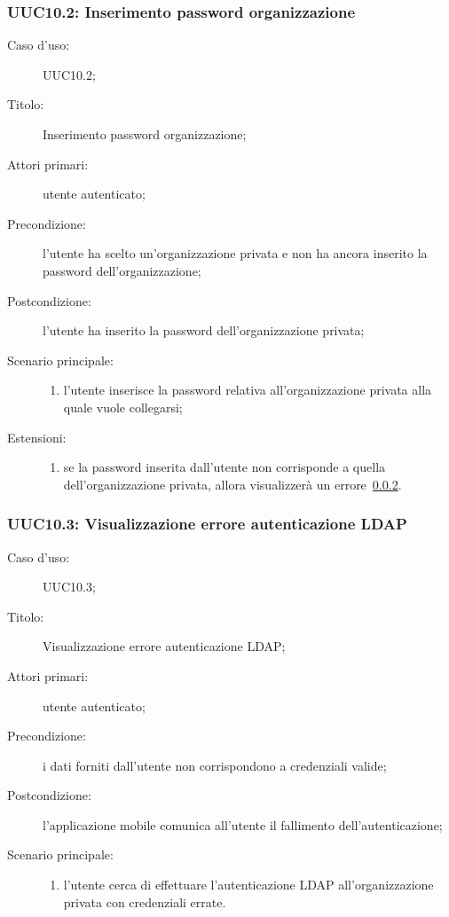 \documentclass[../../../analisi-dei-requisiti.tex]{subfiles}
\begin{document}
\subsubsection{UUC10.2: Inserimento password organizzazione}%
\label{subs:UUC10.2}
\begin{description}
  \item[Caso d’uso:] UUC10.2;
  \item[Titolo:] Inserimento password organizzazione;
  \item[Attori primari:] utente autenticato;
  \item[Precondizione:] l'utente ha scelto un'organizzazione privata e non ha ancora inserito la password dell'organizzazione;
  \item[Postcondizione:] l'utente ha inserito la password dell'organizzazione privata;
  \item[Scenario principale:]
        \begin{enumerate}
          \item l'utente inserisce la password relativa all'organizzazione privata alla quale vuole collegarsi;
        \end{enumerate}
  \item[Estensioni:]
        \begin{enumerate}
          \item se la password inserita dall'utente non corrisponde a quella dell'organizzazione privata, allora visualizzerà un errore~\ref{subs:UUC10.3}.
        \end{enumerate}
\end{description}

\subsubsection{UUC10.3: Visualizzazione errore autenticazione LDAP}%
\label{subs:UUC10.3}
\begin{description}
  \item[Caso d’uso:] UUC10.3;
  \item[Titolo:] Visualizzazione errore autenticazione LDAP\@;
  \item[Attori primari:] utente autenticato;
  \item[Precondizione:] i dati forniti dall'utente non corrispondono a credenziali valide;
  \item[Postcondizione:] l'applicazione mobile comunica all'utente il fallimento dell'autenticazione;
  \item[Scenario principale:]
        \begin{enumerate}
          \item l'utente cerca di effettuare l'autenticazione LDAP all'organizzazione privata con credenziali errate.
        \end{enumerate}
\end{description}
\end{document}
